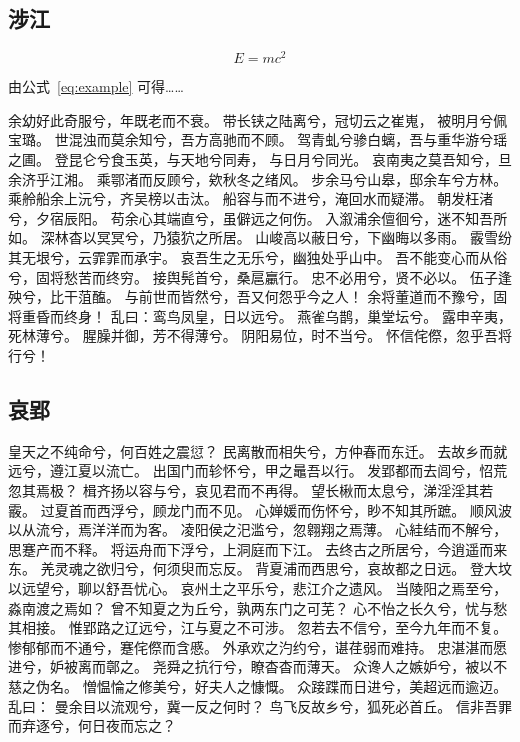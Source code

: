 \subsection{涉江}
\begin{equation}
	E = mc^2
	\label{eq:example}  %
\end{equation}

由公式~\eqref{eq:example} 可得……

余幼好此奇服兮，年既老而不衰。
带长铗之陆离兮，冠切云之崔嵬，
被明月兮佩宝璐。
世混浊而莫余知兮，吾方高驰而不顾。
驾青虬兮骖白螭，吾与重华游兮瑶之圃。
登昆仑兮食玉英，与天地兮同寿，
与日月兮同光。
哀南夷之莫吾知兮，旦余济乎江湘。
乘鄂渚而反顾兮，欸秋冬之绪风。
步余马兮山皋，邸余车兮方林。
乘舲船余上沅兮，齐吴榜以击汰。
船容与而不进兮，淹回水而疑滞。
朝发枉渚兮，夕宿辰阳。
苟余心其端直兮，虽僻远之何伤。
入溆浦余儃徊兮，迷不知吾所如。
深林杳以冥冥兮，乃猿狖之所居。
山峻高以蔽日兮，下幽晦以多雨。
霰雪纷其无垠兮，云霏霏而承宇。
哀吾生之无乐兮，幽独处乎山中。
吾不能变心而从俗兮，固将愁苦而终穷。
接舆髡首兮，桑扈臝行。
忠不必用兮，贤不必以。
伍子逢殃兮，比干菹醢。
与前世而皆然兮，吾又何怨乎今之人！
余将董道而不豫兮，固将重昏而终身！
乱曰：鸾鸟凤皇，日以远兮。
燕雀乌鹊，巢堂坛兮。
露申辛夷，死林薄兮。
腥臊并御，芳不得薄兮。
阴阳易位，时不当兮。
怀信侘傺，忽乎吾将行兮！

\subsection{哀郢}
皇天之不纯命兮，何百姓之震愆？
民离散而相失兮，方仲春而东迁。
去故乡而就远兮，遵江夏以流亡。
出国门而轸怀兮，甲之鼂吾以行。
发郢都而去闾兮，怊荒忽其焉极？
楫齐扬以容与兮，哀见君而不再得。
望长楸而太息兮，涕淫淫其若霰。
过夏首而西浮兮，顾龙门而不见。
心婵媛而伤怀兮，眇不知其所蹠。
顺风波以从流兮，焉洋洋而为客。
凌阳侯之汜滥兮，忽翱翔之焉薄。
心絓结而不解兮，思蹇产而不释。
将运舟而下浮兮，上洞庭而下江。
去终古之所居兮，今逍遥而来东。
羌灵魂之欲归兮，何须臾而忘反。
背夏浦而西思兮，哀故都之日远。
登大坟以远望兮，聊以舒吾忧心。
哀州土之平乐兮，悲江介之遗风。
当陵阳之焉至兮，淼南渡之焉如？
曾不知夏之为丘兮，孰两东门之可芜？
心不怡之长久兮，忧与愁其相接。
惟郢路之辽远兮，江与夏之不可涉。
忽若去不信兮，至今九年而不复。
惨郁郁而不通兮，蹇侘傺而含慼。
外承欢之汋约兮，谌荏弱而难持。
忠湛湛而愿进兮，妒被离而鄣之。
尧舜之抗行兮，瞭杳杳而薄天。
众谗人之嫉妒兮，被以不慈之伪名。
憎愠惀之修美兮，好夫人之慷慨。
众踥蹀而日进兮，美超远而逾迈。
乱曰：
曼余目以流观兮，冀一反之何时？
鸟飞反故乡兮，狐死必首丘。
信非吾罪而弃逐兮，何日夜而忘之？

